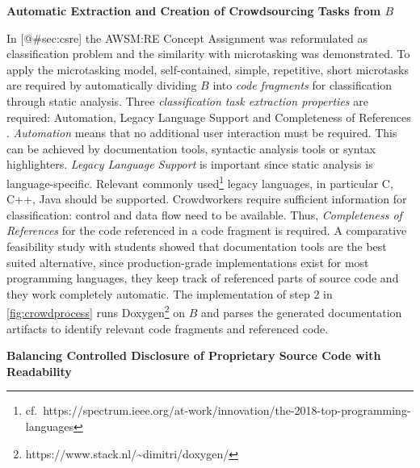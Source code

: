 \textbf{Automatic Extraction and Creation of Crowdsourcing Tasks from \(B\)}

In {[}@\#sec:csre{]} the AWSM:RE Concept Assignment was reformulated as classification problem and the similarity with microtasking was demonstrated.
To apply the microtasking model, self-contained, simple, repetitive, short microtasks are required by automatically dividing \(B\) into \emph{code fragments} for classification through static analysis.
Three \emph{classification task extraction properties} are required: Automation, Legacy Language Support and Completeness of References \autocite{Heil2018CSRE,Heil2019CSRECCIS}.
\emph{Automation} means that no additional user interaction must be required.
This can be achieved by documentation tools, syntactic analysis tools or syntax highlighters.
\emph{Legacy Language Support} is important since static analysis is language-specific.
Relevant commonly used\footnote{cf.~https://spectrum.ieee.org/at-work/innovation/the-2018-top-programming-languages} legacy languages, in particular C, C++, Java should be supported.
Crowdworkers require sufficient information for classification: control and data flow need to be available.
Thus, \emph{Completeness of References} for the code referenced in a code fragment is required.
A comparative feasibility study with students showed that documentation tools are the best suited alternative, since production-grade implementations exist for most programming languages, they keep track of referenced parts of source code and they work completely automatic.
The implementation of step 2 in \cref{fig:crowdprocess} runs Doxygen\footnote{https://www.stack.nl/\textasciitilde dimitri/doxygen/} on \(B\) and parses the generated documentation artifacts to identify relevant code fragments and referenced code.

\textbf{Balancing Controlled Disclosure of Proprietary Source Code with Readability}

